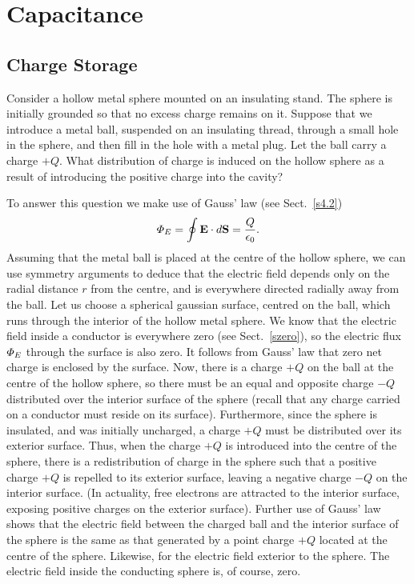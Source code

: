 \section{Capacitance}
\subsection{Charge Storage}
Consider a hollow metal sphere mounted on an insulating stand. The sphere is
 initially grounded so that no excess charge remains on it. Suppose that 
we introduce a metal ball,  suspended on an insulating thread, 
through a small hole in the sphere,
and then fill in the hole with a metal plug. Let the ball carry a charge
$+Q$. What distribution of charge is induced on the hollow sphere as a result
of introducing the positive  charge into the cavity?

To answer this question we make use of Gauss' law (see Sect.~\ref{s4.2})
\begin{equation}
{\mit\Phi}_E= \oint {\bf E}\cdot d{\bf S} = \frac{Q}{\epsilon_0}.
\end{equation}
Assuming that the metal ball is placed at the centre of the hollow sphere,
we can use symmetry arguments to deduce that the electric field 
depends only on the radial distance $r$ from the centre,
and is everywhere directed radially away from the ball. Let us choose a
spherical gaussian surface, centred on the ball, which runs through the
interior of the hollow metal sphere.    We know that the electric field inside a
conductor is everywhere  zero (see Sect.~\ref{szero}), so the electric flux
${\mit\Phi}_E$ through the surface is also zero. It follows from Gauss' law that
zero net charge is enclosed by the surface. Now,  there is a
charge $+Q$ on the ball at the centre of the hollow sphere, so there must  be an equal and
opposite 
 charge $-Q$ distributed over the interior surface of the sphere
(recall that any charge carried on a conductor must reside on its surface). 
Furthermore, since the sphere is insulated, and was initially uncharged, a
charge $+Q$ must be distributed over its exterior surface. Thus, when
the charge $+Q$ is introduced into the centre of the sphere, there is
a redistribution of charge in the sphere such that a positive charge $+Q$
is repelled to its exterior surface, leaving a negative charge $-Q$
on the interior surface. (In actuality, free electrons are attracted to
the interior surface, exposing positive charges on the exterior surface).
Further use of Gauss' law shows that the electric field between the charged ball and
the interior surface of the sphere is the same as that generated by a point
charge 
$+Q$ located at the centre of the sphere. Likewise, for the electric
field exterior to the sphere. The electric field inside the conducting
sphere is, of course,  zero.

